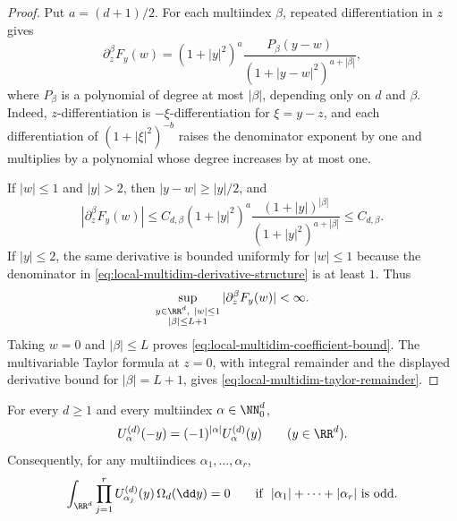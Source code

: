 \begin{proof}
Put \(a=(d+1)/2\).  For each multiindex \(\beta\), repeated
differentiation in \(z\) gives
\begin{equation}\label{eq:local-multidim-derivative-structure}
\partial_z^\beta F_y(w)
=(1+|y|^2)^a
\frac{P_\beta(y-w)}{(1+|y-w|^2)^{a+|\beta|}},
\end{equation}
where \(P_\beta\) is a polynomial of degree at most \(|\beta|\), depending
only on \(d\) and \(\beta\).  Indeed, \(z\)-differentiation is
\(-\xi\)-differentiation for \(\xi=y-z\), and each differentiation of
\((1+|\xi|^2)^{-b}\) raises the denominator exponent by one and multiplies
by a polynomial whose degree increases by at most one.

If \(|w|\le1\) and \(|y|>2\), then \(|y-w|\ge |y|/2\), and
\[
|\partial_z^\beta F_y(w)|
\le C_{d,\beta}
(1+|y|^2)^a
\frac{(1+|y|)^{|\beta|}}{(1+|y|^2)^{a+|\beta|}}
\le C_{d,\beta}.
\]
If \(|y|\le2\), the same derivative is bounded uniformly for \(|w|\le1\)
because the denominator in \eqref{eq:local-multidim-derivative-structure}
is at least \(1\).  Thus
\[
\sup_{\substack{y\in\RR^d,\ |w|\le1\\ |\beta|\le L+1}}
|\partial_z^\beta F_y(w)|<\infty .
\]
Taking \(w=0\) and \(|\beta|\le L\) proves
\eqref{eq:local-multidim-coefficient-bound}.  The multivariable Taylor
formula at \(z=0\), with integral remainder and the displayed derivative
bound for \(|\beta|=L+1\), gives
\eqref{eq:local-multidim-taylor-remainder}.
\end{proof}

\begin{lemma}%
\label{lem:multidim-cayley-poisson-mode-parity}
For every \(d\ge1\) and every multiindex \(\alpha\in\NN_0^d\),
\begin{equation}\label{eq:multidim-cayley-poisson-mode-parity}
U_\alpha^{(d)}(-y)=(-1)^{|\alpha|}U_\alpha^{(d)}(y)
\qquad(y\in\RR^d).
\end{equation}
Consequently, for any multiindices
\(\alpha_1,\ldots,\alpha_r\),
\begin{equation}\label{eq:multidim-cayley-poisson-product-parity}
\int_{\RR^d}\prod_{j=1}^r
U_{\alpha_j}^{(d)}(y)\,\Omega_d(\dd y)=0
\qquad\text{if }\ |\alpha_1|+\cdots+|\alpha_r|\text{ is odd}.
\end{equation}
\end{lemma}

